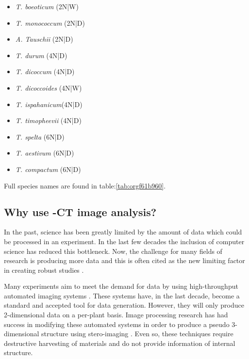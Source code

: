 \documentclass[11pt]{report}
\begin{document}
\begin{multicols}{3}

  \begin{itemize}
  \item{\textit{T. boeoticum} (2N|W)}
  \item{\textit{T. monococcum} (2N|D)}
  \item{\textit{A. Tauschii} (2N|D)}
  \end{itemize}

  \columnbreak

  \begin{itemize}
  \item{\textit{T. durum} (4N|D)}
  \item{\textit{T. dicoccum} (4N|D)}
  \item{\textit{T. dicoccoides} (4N|W)}
  \item{\textit{T. ispahanicum}(4N|D)}
  \item{\textit{T. timopheevii} (4N|D)}
  \end{itemize}

  \columnbreak

  \begin{itemize}
  \item{\textit{T. spelta} (6N|D)}
  \item{\textit{T. aestivum} (6N|D)}
  \item{\textit{T. compactum} (6N|D)}
  \end{itemize}

\end{multicols}
Full species names are found in table:\ref{tab:orgf61b960}.

\subsection{Why use \textmu{}-CT image analysis?}
\label{sec:org826da0e}
In the past, science has been greatly limited by the amount of data which could be processed in an experiment. In the last few decades the inclusion of computer science has reduced this bottleneck. Now, the challenge for many fields of research is producing more data and this is often cited as the new limiting factor in creating robust studies \cite{Furbank2011}.

Many experiments aim to meet the demand for data by using high-throughput automated imaging systems \cite{Naumann2007,Prasanna2013,Humplik2015}. These systems have, in the last decade, become a standard and accepted tool for data generation. However, they will only produce 2-dimensional data on a per-plant basis. Image processing research has had success in modifying these automated systems in order to produce a pseudo 3-dimensional structure using stero-imaging \cite{Roussel2016}. Even so, these techniques require destructive harvesting of materials and do not provide information of internal structure.
\end{document}
